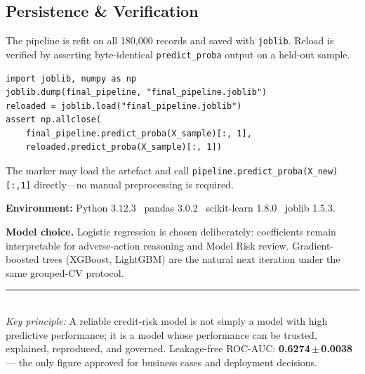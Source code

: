\documentclass[10pt,a4paper]{article}
\begin{document}
\subsection*{Persistence \& Verification}

The pipeline is refit on all 180,000 records and saved with
\texttt{joblib}. Reload is verified by asserting byte-identical
\texttt{predict\_proba} output on a held-out sample.

\begin{lstlisting}[caption={Persistence and verification.}]
import joblib, numpy as np
joblib.dump(final_pipeline, "final_pipeline.joblib")
reloaded = joblib.load("final_pipeline.joblib")
assert np.allclose(
    final_pipeline.predict_proba(X_sample)[:, 1],
    reloaded.predict_proba(X_sample)[:, 1])
\end{lstlisting}

The marker may load the artefact and call
\texttt{pipeline.predict\_proba(X\_new)[:,1]} directly---no manual
preprocessing is required.

\textbf{Environment:} Python 3.12.3 \textbullet\ pandas 3.0.2
\textbullet\ scikit-learn 1.8.0 \textbullet\ joblib 1.5.3.

\textbf{Model choice.} Logistic regression is chosen deliberately:
coefficients remain interpretable for adverse-action reasoning and
Model Risk review. Gradient-boosted trees (XGBoost, LightGBM) are
the natural next iteration under the same grouped-CV protocol.



\vspace{4pt}
\noindent\rule{\textwidth}{0.5pt}\\[1pt]
{\footnotesize\textit{Key principle:} A reliable credit-risk model is not
simply a model with high predictive performance; it is a model whose
performance can be trusted, explained, reproduced, and governed.
\hfill
Leakage-free ROC-AUC: \textbf{0.6274\,$\pm$\,0.0038} ---
the only figure approved for business cases and deployment decisions.}
\end{document}
